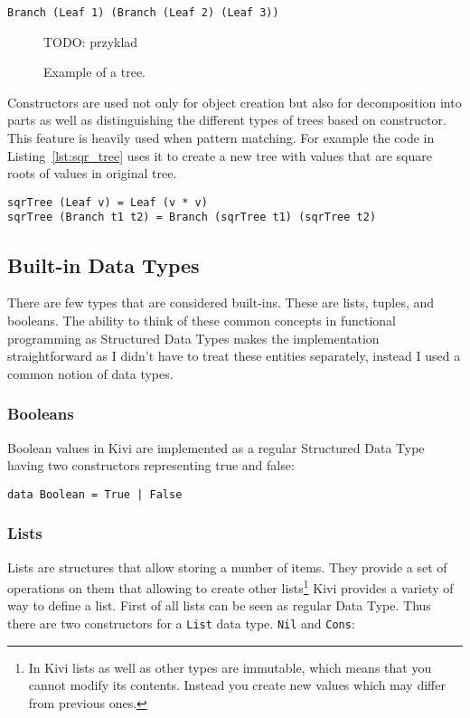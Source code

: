 \documentclass[12pt,a4paper]{report}
\begin{document}
\hspace*{-1.5in}
\begin{lstlisting}[style=haskell]
Branch (Leaf 1) (Branch (Leaf 2) (Leaf 3))
\end{lstlisting}

\begin{figure}[h!]
  \centering

  TODO: przyklad

  \caption{Example of a tree.}
  \label{fig:tree}
\end{figure}

Constructors are used not only for object creation but also for decomposition
into parts as well as distinguishing the different types of trees based on
constructor. This feature is heavily used when pattern matching. For example
the code in Listing~\ref{lst:sqr_tree} uses it to create a new tree with values
that are square roots of values in original tree.

\hspace*{-1.5in}
\begin{lstlisting}[label=lst:sqr_tree,caption={Creating a `square rooted` tree.}]
sqrTree (Leaf v) = Leaf (v * v)
sqrTree (Branch t1 t2) = Branch (sqrTree t1) (sqrTree t2)
\end{lstlisting}

\subsection{Built-in Data Types}
There are few types that are considered built-ins. These are lists, tuples,
and booleans. The ability to think of these common concepts in functional
programming as Structured Data Types makes the implementation straightforward
as I didn't have to treat these entities separately, instead I used a common
notion of data types.
\subsubsection{Booleans}
Boolean values in Kivi are implemented as a regular Structured Data Type having
two constructors representing true and false:

\hspace*{-1.5in}
\begin{lstlisting}[style=haskell]
data Boolean = True | False
\end{lstlisting}

\subsubsection{Lists}
Lists are structures that allow storing a number of items. They
provide a set of operations on them that allowing to create other
lists\footnote{In Kivi lists as well as other types are immutable, which means
that you cannot modify its contents. Instead you create new values which may
differ from previous ones. }
Kivi provides a variety of way to define a list. First of all lists can be seen
as regular Data Type. Thus there are two constructors for a \texttt{List}
data type. \texttt{Nil} and \texttt{Cons}:
\end{document}
